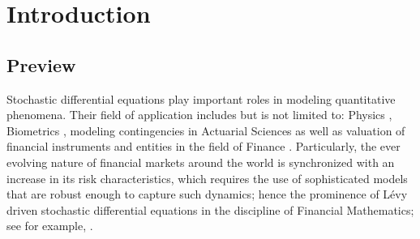 \chapter{Introduction}
\section{Preview}
Stochastic differential equations play important roles in modeling quantitative phenomena. Their field of application includes but is not limited to: Physics , Biometrics , modeling contingencies in Actuarial Sciences as well as valuation of financial instruments and entities in the field of Finance . Particularly, the ever evolving nature of financial markets around the world is synchronized with an increase in its risk characteristics, which requires the use of sophisticated models that are robust enough to capture such dynamics; hence the prominence of  L\'evy driven stochastic differential equations in the discipline of Financial Mathematics; see for example, .

